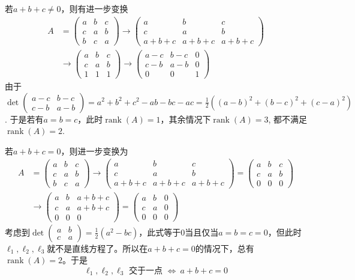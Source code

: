 若$a+b+c\neq 0$，则有进一步变换
\begin{align*}
A & = \begin{pmatrix} a & b & c \\ c & a & b \\ b & c & a \end{pmatrix} \to \begin{pmatrix} a & b & c \\ c & a & b \\ a+b+c & a+b+c & a+b+c \end{pmatrix} \\
& \to \begin{pmatrix} a & b & c \\ c & a & b \\ 1 & 1 & 1 \end{pmatrix} \to \begin{pmatrix} a-c & b-c & 0 \\ c-b & a-b & 0 \\ 0 & 0 & 1 \end{pmatrix}
\end{align*}
由于$\det\begin{pmatrix} a-c & b-c \\ c-b & a-b \end{pmatrix} = a^2+b^2+c^2-ab-bc-ac = \frac12\left( (a-b)^2 + (b-c)^2 + (c-a)^2 \right)$. 于是若有$a=b=c$，此时$\operatorname{rank}(A) = 1$，其余情况下$\operatorname{rank}(A) = 3$, 都不满足$\operatorname{rank}(A) = 2$.

若$a+b+c=0$，则进一步变换为
\begin{align*}
A & = \begin{pmatrix} a & b & c \\ c & a & b \\ b & c & a \end{pmatrix} \to \begin{pmatrix} a & b & c \\ c & a & b \\ a+b+c & a+b+c & a+b+c \end{pmatrix} = \begin{pmatrix} a & b & c \\ c & a & b \\ 0 & 0 & 0 \end{pmatrix}\\
& \to \begin{pmatrix} a & b & a+b+c \\ c & a & a+b+c \\ 0 & 0 & 0 \end{pmatrix} = \begin{pmatrix} a & b & 0 \\ c & a & 0 \\ 0 & 0 & 0 \end{pmatrix}
\end{align*}
考虑到$\det\begin{pmatrix} a & b \\ c & a \end{pmatrix} = \frac12\left( a^2-bc\right)$，此式等于$0$当且仅当$a=b=c=0$，但此时$\ell_1,\ell_2,\ell_3$就不是直线方程了。所以在$a+b+c=0$的情况下，总有$\operatorname{rank}(A) = 2$。于是
$$\ell_1,\ell_2,\ell_3 \text{ 交于一点 } \Longleftrightarrow \ a+b+c=0$$


